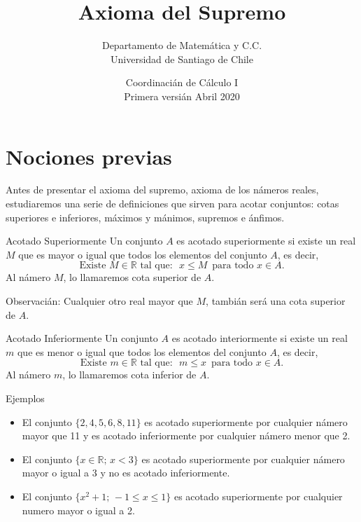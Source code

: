 \documentclass[5pt]{article} %
\title{Axioma del Supremo }
\author{\vspace{.5cm}Departamento de Matem\'atica y C.C.\\ \vspace{.1cm}Universidad de Santiago de Chile}
\date{\tiny Coordinacián de Cálculo I\\ \vspace{.1 cm} Primera versián Abril 2020}
\begin{document}
	\maketitle

\section{Nociones previas}
Antes de presentar el axioma del supremo, axioma de los námeros reales, estudiaremos una serie de definiciones que sirven para acotar conjuntos: cotas superiores e inferiores, máximos y mánimos,
supremos e ánfimos. \\\vspace{.3cm}


{Acotado Superiormente} Un conjunto $A$ es acotado superiormente si existe un real $M$ que es mayor o igual que todos los elementos del conjunto $A$, es decir,
	\begin{equation}
        \label{AcotadoSup}
	    \mbox{Existe}\,\,M\in\mathbb{R}\,\,\mbox{tal que}:\,\,\, x\leq M\,\,\,\mbox{para todo}\,\,x\in A.
	\end{equation}
Al námero $M$, lo llamaremos cota superior de $A$.
	\vspace{.2cm}



Observacián: Cualquier otro real mayor que $M$, tambián será una cota superior de $A$.




	{Acotado Inferiormente} Un conjunto $A$ es acotado interiormente si existe un real $m$ que es menor o igual que todos los elementos del conjunto $A$, es decir,
		$$\mbox{Existe}\,\,m\in\mathbb{R}\,\,\mbox{tal que}:\,\,\, m\leq x\,\,\,\mbox{para todo}\,\,x\in A.$$
		Al námero $m$, lo llamaremos cota inferior de $A$.
		\vspace{.2cm}


{Ejemplos}
\begin{itemize}
	\item El conjunto $\{2,4,5,6,8,11\}$ es acotado superiormente por cualquier námero mayor que 11 y es acotado inferiormente por cualquier námero menor que 2.

	\item El conjunto $\{x\in\mathbb{R};\, x<3\}$ es acotado superiormente por cualquier námero mayor o igual a 3 y no es acotado inferiormente.

	\item El conjunto $\{x^2+1;\, -1\leq x\leq 1\}$ es acotado superiormente por cualquier numero mayor o igual a 2.
\end{itemize}
\end{document}
